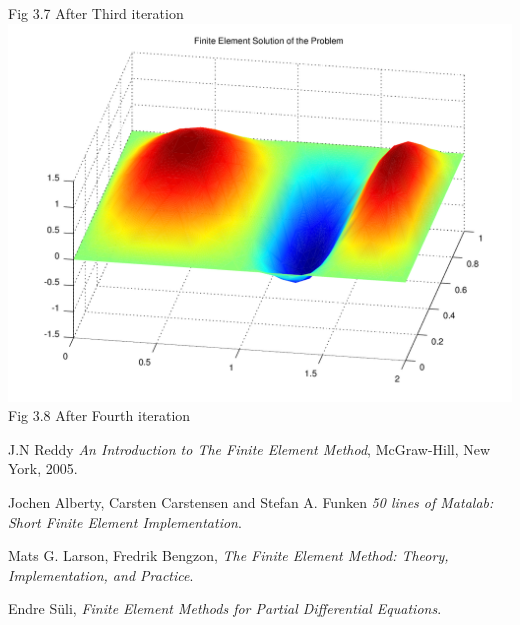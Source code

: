 \documentclass{report}
\numberwithin{equation}{chapter}
\begin{document}
\begin{center}
{Fig 3.7 After Third iteration}
\includegraphics[scale=0.58]{44}\hspace*{70cm}
{Fig 3.8 After Fourth iteration}
\end{center}


\newpage
\begin{thebibliography}{9}
 J.N Reddy \emph{An Introduction to The Finite Element Method}, McGraw-Hill, New York, 2005.


Jochen Alberty, Carsten Carstensen and Stefan A. Funken \emph{50 lines of Matalab: Short Finite Element Implementation}.

 Mats G. Larson, Fredrik Bengzon, \emph{The Finite Element Method:
Theory, Implementation, and Practice}.

 Endre S\"{u}li, \emph{Finite Element Methods for Partial
Differential Equations}.

\end{thebibliography}
\end{document}
